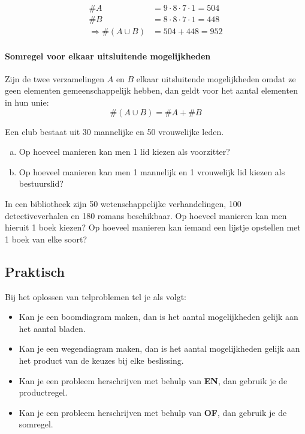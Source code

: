 \documentclass[12pt,a4,twoside]{article}
\begin{document}
\begin{align*}
\#A &= 9 \cdot 8 \cdot 7 \cdot 1 = 504\\
\#B &= 8 \cdot 8 \cdot 7 \cdot 1 = 448\\
\Rightarrow \#(A \cup B) &= 504 + 448 = 952
\end{align*}

\paragraph*{Somregel voor elkaar uitsluitende mogelijkheden}
\begin{mdframed}
Zijn de twee verzamelingen $A$ en $B$ elkaar uitsluitende mogelijkheden omdat ze geen elementen gemeenschappelijk hebben, dan geldt voor het aantal elementen in hun unie:
\[\#(A\cup B) = \#A + \#B\]
\end{mdframed}

\begin{oefening}
Een club bestaat uit 30 mannelijke en 50 vrouwelijke leden.
\begin{enumerate}[(a)]
  \item Op hoeveel manieren kan men 1 lid kiezen als voorzitter?
  \item Op hoeveel manieren kan men 1 mannelijk en 1 vrouwelijk lid kiezen als bestuurslid?
\end{enumerate}
\end{oefening}

\begin{oefening}
In een bibliotheek zijn 50 wetenschappelijke verhandelingen, 100 detectiveverhalen en 180 romans beschikbaar. Op hoeveel manieren kan men hieruit 1 boek kiezen? Op hoeveel manieren kan iemand een lijstje opstellen met 1 boek van elke soort?
\end{oefening}

\subsection{Praktisch}

\begin{mdframed}
Bij het oplossen van telproblemen tel je als volgt:
\begin{itemize}
  \item Kan je een boomdiagram maken, dan is het aantal mogelijkheden gelijk aan het aantal bladen.
  \item Kan je een wegendiagram maken, dan is het aantal mogelijkheden gelijk aan het product van de keuzes bij elke beslissing.
  \item Kan je een probleem herschrijven met behulp van {\bf EN}, dan gebruik je de productregel.
  \item Kan je een probleem herschrijven met behulp van {\bf OF}, dan gebruik je de somregel.
\end{itemize}
\end{mdframed}
\end{document}
